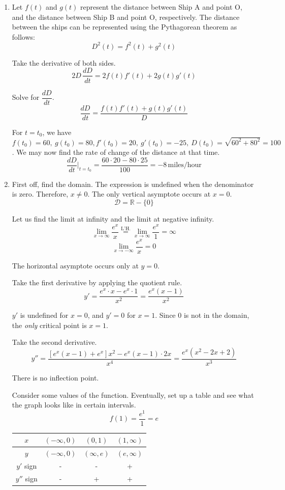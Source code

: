 \documentclass[a4paper, 12pt]{article}
\begin{document}
\begin{enumerate}[leftmargin=*,label=\textbf{\arabic*.}]
\item Let $f(t)$ and $g(t)$ represent the distance between Ship A and point O, and the distance between Ship B and point O, respectively. The distance between the ships can be represented using the Pythagorean theorem as follows:
\[D^2(t)=f^2(t)+g^2(t)\]

Take the derivative of both sides.
\[2D\,\frac{dD}{dt} = 2f(t)f'(t) + 2g(t)g'(t)\]

Solve for $\dfrac{dD}{dt}$.
\[\frac{dD}{dt} = \frac{f(t)f'(t) + g(t)g'(t)}{\displaystyle D}\]

For $t=t_0$, we have $f(t_0)=60,\:g(t_0)=80,f'(t_0)=20,\:g'(t_0)=-25,\:D(t_0)=\sqrt{60^2+80^2}=100$. We may now find the rate of change of the distance at that time.
\[\frac{dD}{dt}\Bigg|_{t=t_0} = \frac{60\cdot 20 -80 \cdot 25}{\displaystyle 100} = \boxed{-8 \, \text{miles/hour}}\]

\item First off, find the domain. The expression is undefined when the denominator is zero. Therefore, $x\neq 0$. The only vertical asymptote occurs at $x = 0$.
\[\mathcal{D} = \mathbb{R} - \{0\}\]

Let us find the limit at infinity and the limit at negative infinity.
\[\lim_{x\to\infty}\frac{ e^x}{x}\overset{\text{L'H.}}{=}\lim_{x\to\infty}\frac{ e^x}{1}=\infty\]
\[\lim_{x\to-\infty}\frac{ e^x}{x}=0\]

The horizontal asymptote occurs only at $y=0$.

Take the first derivative by applying the quotient rule.
\[y'=\frac{ e^x\cdot x- e^x\cdot1}{x^2}=\frac{ e^x(x-1)}{x^2}\]

$y'$ is undefined for $x=0$, and $y'=0$ for $x=1$. Since 0 is not in the domain, the \textit{only} critical point is $x=1$.

Take the second derivative.
\[y''=\frac{[ e^x(x-1)+ e^x]x^2- e^x(x-1)\cdot2x}{x^4}=\frac{ e^x(x^2-2x+2)}{x^3}\]

There is no inflection point.

Consider some values of the function. Eventually, set up a table and see what the graph looks like in certain intervals.
\[f(1) = \frac{ e^1}{1} =  e\]
\begin{center}
    \begin{tabular}{ |c| c c c| } 
    \hline
        $x$ & $(-\infty, 0)$ & $(0, 1)$ & $(1, \infty)$  \\
        \hline
        $y$ & $(-\infty, 0)$ & $(\infty,  e)$ & $( e, \infty)$\\
        \hline
        $y'$ sign & - & - & + \\
        \hline
        $y''$ sign & - & + & + \\
        \hline
    \end{tabular}
\end{center}


\end{enumerate}
\end{document}

